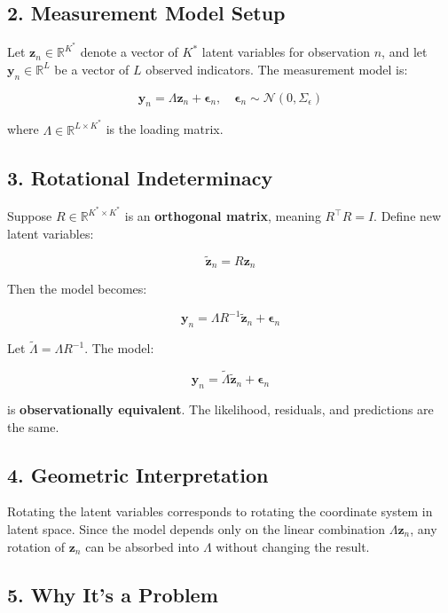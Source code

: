 \documentclass[12pt,a4paper]{article}
\begin{document}
\subsection{2. Measurement Model Setup}

Let $\mathbf{z}_n \in \mathbb{R}^{K^*}$ denote a vector of $K^*$ latent variables for observation $n$, and let $\mathbf{y}_n \in \mathbb{R}^L$ be a vector of $L$ observed indicators. The measurement model is:

\[
\mathbf{y}_n = \Lambda \mathbf{z}_n + \boldsymbol{\epsilon}_n, \quad \boldsymbol{\epsilon}_n \sim \mathcal{N}(0, \Sigma_\epsilon)
\]

where $\Lambda \in \mathbb{R}^{L \times K^*}$ is the loading matrix.

\subsection{3. Rotational Indeterminacy}

Suppose $R \in \mathbb{R}^{K^* \times K^*}$ is an \textbf{orthogonal matrix}, meaning $R^\top R = I$. Define new latent variables:

\[
\tilde{\mathbf{z}}_n = R \mathbf{z}_n
\]

Then the model becomes:

\[
\mathbf{y}_n = \Lambda R^{-1} \tilde{\mathbf{z}}_n + \boldsymbol{\epsilon}_n
\]

Let $\tilde{\Lambda} = \Lambda R^{-1}$. The model:

\[
\mathbf{y}_n = \tilde{\Lambda} \tilde{\mathbf{z}}_n + \boldsymbol{\epsilon}_n
\]

is \textbf{observationally equivalent}. The likelihood, residuals, and predictions are the same.

\subsection{4. Geometric Interpretation}

Rotating the latent variables corresponds to rotating the coordinate system in latent space. Since the model depends only on the linear combination $\Lambda \mathbf{z}_n$, any rotation of $\mathbf{z}_n$ can be absorbed into $\Lambda$ without changing the result.

\subsection{5. Why It's a Problem}
\end{document}
